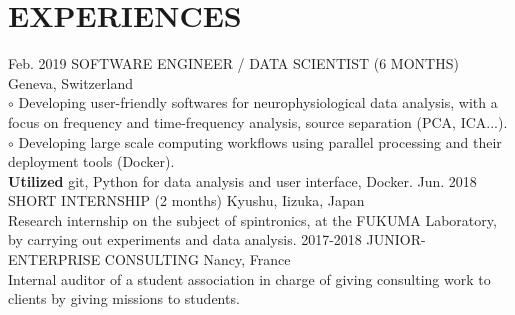 \documentclass[]{cv-style}          %
\begin{document}
\section{EXPERIENCES}
\begin{entrylist}
\entry
  {Feb. 2019}
  {SOFTWARE ENGINEER / DATA SCIENTIST (6 MONTHS)}
  {Geneva, Switzerland}
  {\\
 $\circ$ Developing user-friendly softwares for neurophysiological data analysis, with a focus on frequency and time-frequency analysis, source separation (PCA, ICA...).\\
  $\circ$ Developing large scale computing workflows using parallel processing and their deployment tools (Docker).\\
  \textbf{Utilized} git, Python for data analysis and user interface, Docker.
  \vspace{0.2cm}
  }
\entry
  {Jun. 2018}
  {SHORT INTERNSHIP (2 months)}
  {Kyushu, Iizuka, Japan}
  {\\
  Research internship on the subject of spintronics, at the FUKUMA Laboratory, by carrying out experiments and data analysis. 
  \vspace{0.2cm}
  }
\entry
  {2017-2018}
  {JUNIOR-ENTERPRISE CONSULTING}
  {Nancy, France}
  {\\
  Internal auditor of a student association in charge of giving consulting work to clients by giving missions to students.\\
}
\end{entrylist}
%
%
\newpage
\hphantom\\
\end{document}
